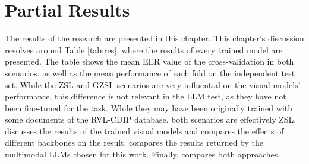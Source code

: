 \section{Partial Results}
\label{sec:results}

The results of the research are presented in this chapter. This chapter's discussion revolves around Table \ref{tab:res}, where the results of every trained model are presented. The table shows the mean EER value of the cross-validation in both scenarios, as well as the mean performance of each fold on the independent test set. While the \gls{ZSL} and \gls{GZSL} scenarios are very influential on the visual models' performance, this difference is not relevant in the \gls{LLM} test, as they have not been fine-tuned for the task. While they may have been originally trained with some documents of the RVL-CDIP database, both scenarios are effectively \gls{ZSL}.  discusses the results of the trained visual models and compares the effects of different backbones on the result.  compares the results returned by the multimodal \glspl{LLM} chosen for this work. Finally,  compares both approaches.

